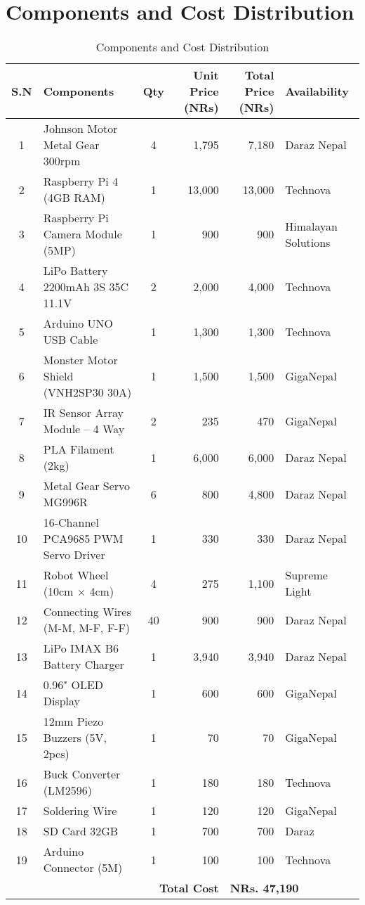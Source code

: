 \section*{Components and Cost Distribution}

\begin{table}[h]
\centering
\small  %
\renewcommand{\arraystretch}{1.05}  %
\begin{tabular}{|c|p{4.6cm}|c|r|r|p{3cm}|}
\hline
\textbf{S.N} & \textbf{Components} & \textbf{Qty} & \textbf{Unit Price (NRs)} & \textbf{Total Price (NRs)} & \textbf{Availability} \\
\hline
1  & Johnson Motor Metal Gear 300rpm & 4 & 1,795 & 7,180 & Daraz Nepal \\\hline
2  & Raspberry Pi 4 (4GB RAM) & 1 & 13,000 & 13,000 & Technova \\\hline
3  & Raspberry Pi Camera Module (5MP) & 1 & 900 & 900 & Himalayan Solutions \\\hline
4  & LiPo Battery 2200mAh 3S 35C 11.1V & 2 & 2,000 & 4,000 & Technova \\\hline
5  & Arduino UNO USB Cable & 1 & 1,300 & 1,300 & Technova \\\hline
6  & Monster Motor Shield (VNH2SP30 30A) & 1 & 1,500 & 1,500 & GigaNepal \\\hline
7  & IR Sensor Array Module – 4 Way & 2 & 235 & 470 & GigaNepal \\\hline
8  & PLA Filament (2kg) & 1 & 6,000 & 6,000 & Daraz Nepal \\\hline
9  & Metal Gear Servo MG996R & 6 & 800 & 4,800 & Daraz Nepal \\\hline
10 & 16-Channel PCA9685 PWM Servo Driver & 1 & 330 & 330 & Daraz Nepal \\\hline
11 & Robot Wheel (10cm × 4cm) & 4 & 275 & 1,100 & Supreme Light \\\hline
12 & Connecting Wires (M-M, M-F, F-F) & 40 & 900 & 900 & Daraz Nepal \\\hline
13 & LiPo IMAX B6 Battery Charger & 1 & 3,940 & 3,940 & Daraz Nepal \\\hline
14 & 0.96" OLED Display & 1 & 600 & 600 & GigaNepal \\\hline
15 & 12mm Piezo Buzzers (5V, 2pcs) & 1 & 70 & 70 & GigaNepal \\\hline
16 & Buck Converter (LM2596) & 1 & 180 & 180 & Technova \\\hline
17 & Soldering Wire & 1 & 120 & 120 & GigaNepal \\\hline
18 & SD Card 32GB & 1 & 700 & 700 & Daraz \\\hline
19 & Arduino Connector (5M) & 1 & 100 & 100 & Technova \\
\hline
\multicolumn{4}{|r|}{\textbf{Total Cost}} & \multicolumn{2}{l|}{\textbf{NRs. 47,190}} \\
\hline
\end{tabular}
\caption{Components and Cost Distribution}
\end{table}
